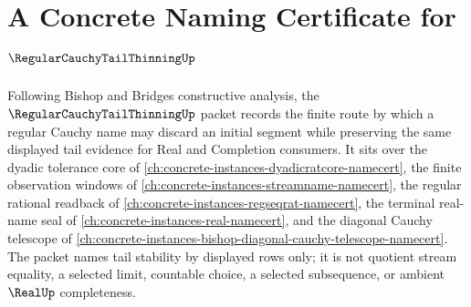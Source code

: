\chapter{A Concrete Naming Certificate for $\RegularCauchyTailThinningUp$}
\label{ch:concrete-instances-regular-cauchy-tail-thinning-namecert}

Following Bishop and Bridges constructive analysis, the $\RegularCauchyTailThinningUp$ packet records the finite route by which a regular Cauchy name may discard an initial segment while preserving the same displayed tail evidence for Real and Completion consumers. It sits over the dyadic tolerance core of \autoref{ch:concrete-instances-dyadicratcore-namecert}, the finite observation windows of \autoref{ch:concrete-instances-streamname-namecert}, the regular rational readback of \autoref{ch:concrete-instances-regseqrat-namecert}, the terminal real-name seal of \autoref{ch:concrete-instances-real-namecert}, and the diagonal Cauchy telescope of \autoref{ch:concrete-instances-bishop-diagonal-cauchy-telescope-namecert}. The packet names tail stability by displayed rows only; it is not quotient stream equality, a selected limit, countable choice, a selected subsequence, or ambient $\RealUp$ completeness.


